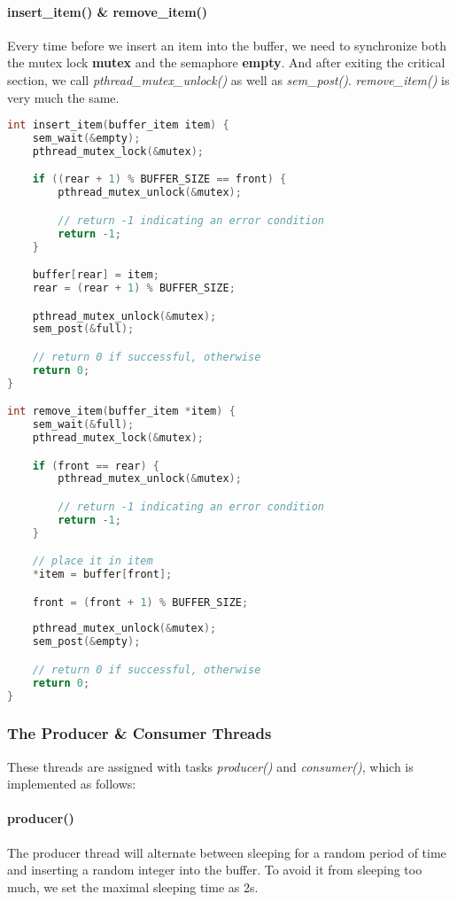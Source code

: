 \documentclass{article}
\begin{document}
\paragraph{insert\_item() \& remove\_item()} Every time before we insert an item into the buffer, we need to synchronize both the mutex lock \textbf{mutex} and the semaphore \textbf{empty}. And after exiting the critical section, we call \textit{pthread\_mutex\_unlock()} as well as \textit{sem\_post()}. \textit{remove\_item()} is very much the same.

\begin{lstlisting}[language=c]
int insert_item(buffer_item item) {
    sem_wait(&empty);
    pthread_mutex_lock(&mutex);

    if ((rear + 1) % BUFFER_SIZE == front) {        
        pthread_mutex_unlock(&mutex);

        // return -1 indicating an error condition 
        return -1;
    }

    buffer[rear] = item;
    rear = (rear + 1) % BUFFER_SIZE;

    pthread_mutex_unlock(&mutex);
    sem_post(&full);

    // return 0 if successful, otherwise
    return 0;
}

int remove_item(buffer_item *item) {
    sem_wait(&full);
    pthread_mutex_lock(&mutex);

    if (front == rear) {
        pthread_mutex_unlock(&mutex);

        // return -1 indicating an error condition
        return -1;
    }

    // place it in item
    *item = buffer[front];

    front = (front + 1) % BUFFER_SIZE;
    
    pthread_mutex_unlock(&mutex);
    sem_post(&empty);

    // return 0 if successful, otherwise
    return 0;
}
\end{lstlisting}

\subsubsection*{The Producer \& Consumer Threads}
These threads are assigned with tasks \textit{producer()} and \textit{consumer()}, which is implemented as follows:

\paragraph{\textbf{producer()}} 
The producer thread will alternate between sleeping for a random period of
time and inserting a random integer into the buffer. To avoid it from sleeping too much, we set the maximal sleeping time as 2s.
\end{document}
